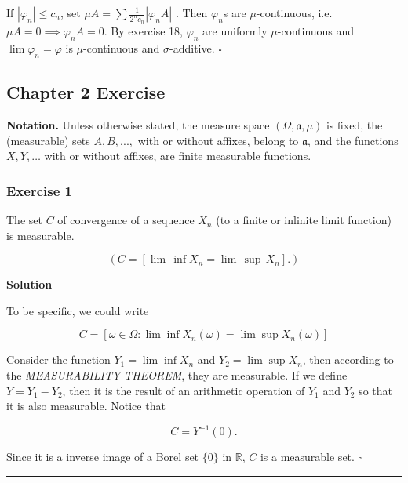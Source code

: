 \documentclass[
]{article}
\begin{document}
If \(\left|\varphi_n\right| \le c_n\), set
\(\mu A=\sum \frac{1}{2^n c_n}\left|\varphi_n A\right|\) . Then
\(\varphi_n\)\textquotesingle s are \(\mu\)-continuous, i.e.
\(\mu A = 0 \implies \varphi_n A = 0\). By exercise 18, \(\varphi_n\)
are uniformly \(\mu\)-continuous and \(\lim \varphi_n=\varphi\) is
\(\mu\)-continuous and \(\sigma\)-additive. \(\square\)

\hypertarget{chapter-2-exercise}{%
  \subsection{Chapter 2 Exercise}\label{chapter-2-exercise}}

\textbf{Notation.} Unless otherwise stated, the measure space
\((\Omega,\mathfrak a, \mu)\) is fixed, the (measurable) sets
\(A, B, ...,\) with or without affixes, belong to \(\mathfrak a\), and
the functions \(X, Y, \dots\) with or without affixes, are finite
measurable functions.

\hypertarget{exercise-1}{%
  \subsubsection{\texorpdfstring{Exercise 1
    }{Exercise 1 }}\label{exercise-1}}

The set \(C\) of convergence of a sequence \(X_{n}\) (to a finite or
inlinite limit function) is measurable.

\[(C=\left[\operatorname*{lim}\,\operatorname{inf}X_{n}=\operatorname*{lim}\,\operatorname*{sup}\,X_{n}\right].)\]

\textbf{Solution}

To be specific, we could write

\[C = \left[\omega\in \Omega: \lim\inf X_n(\omega) = \lim\sup X_n(\omega)\right]\]

Consider the function \(Y_1 = \lim \inf X_n\) and
\(Y_2 = \lim\sup X_n\), then according to the \emph{MEASURABILITY
  THEOREM}, they are measurable. If we define \(Y = Y_1 - Y_2\), then it
is the result of an arithmetic operation of \(Y_1\) and \(Y_2\) so that
it is also measurable. Notice that

\[C = Y^{-1}(0).\]

Since it is a inverse image of a Borel set \(\{0\}\) in \(\mathbb R\),
\(C\) is a measurable set. \(\square\)

\begin{center}\rule{0.5\linewidth}{0.5pt}\end{center}
\end{document}
